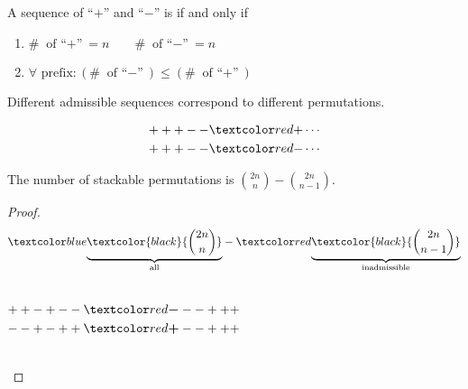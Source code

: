 \begin{frame}{}
  \begin{definition}
    A sequence of ``$+$'' and ``$-$'' is  if and only if
    \pause
    \begin{enumerate}
      \item $\# \text{ of ``$+$''} = n \qquad \# \text{ of ``$-$''} = n$
      \item $\forall \text{ prefix}: (\# \text{ of ``$-$''}) \le (\# \text{ of ``$+$''})$
    \end{enumerate}
  \end{definition}

  \vspace{0.50cm}
  \pause
  \begin{theorem}
    Different admissible sequences correspond to different permutations.
  \end{theorem}

  \pause
  \begin{align*}
    +++--\red{+} \cdots \\
    +++--\red{-} \cdots \\
  \end{align*}
\end{frame}

\begin{frame}{}
  \begin{theorem}
    The number of stackable permutations is ${2n \choose n} - {2n \choose n-1}$.
  \end{theorem}

  \begin{proof}
    \[
      \blue{\underbrace{\textcolor{black}{{2n \choose n}}}_{\text{all}}} 
      - \red{\underbrace{\textcolor{black}{{2n \choose n-1}}}_{\text{inadmissible}}}
    \]

    \vspace{0.20cm}
    \begin{columns}[c]
	\pause
	\[
	  ++-+--\red{\bm{-}}--+++
	\]
	\pause
	\[
	  --+-++\red{\bm{+}}--+++
	\]
	\uncover<6->{%
	  \[
	    ++--\blue{\bm{-}}+
	  \]
	}
	\uncover<5->{%
	  \[
	    --++\blue{\bm{+}}+
	  \]
	}
    \end{columns}

    \vspace{0.30cm}
  \end{proof}
\end{frame}

